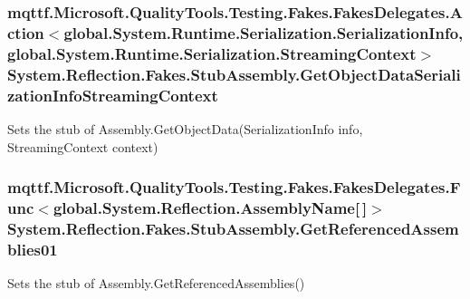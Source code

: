 \hypertarget{class_system_1_1_reflection_1_1_fakes_1_1_stub_assembly_ae5b6f1a1963fa7cfa7d3bb809ce10da7}{
\subsubsection[{Get\-Object\-Data\-Serialization\-Info\-Streaming\-Context}]{\setlength{\rightskip}{0pt plus 5cm}mqttf.\-Microsoft.\-Quality\-Tools.\-Testing.\-Fakes.\-Fakes\-Delegates.\-Action$<$global.\-System.\-Runtime.\-Serialization.\-Serialization\-Info, global.\-System.\-Runtime.\-Serialization.\-Streaming\-Context$>$ System.\-Reflection.\-Fakes.\-Stub\-Assembly.\-Get\-Object\-Data\-Serialization\-Info\-Streaming\-Context}}\label{class_system_1_1_reflection_1_1_fakes_1_1_stub_assembly_ae5b6f1a1963fa7cfa7d3bb809ce10da7}


Sets the stub of Assembly.\-Get\-Object\-Data(\-Serialization\-Info info, Streaming\-Context context)

\hypertarget{class_system_1_1_reflection_1_1_fakes_1_1_stub_assembly_a6da2bc6677f3887addc1c6f676ef32b7}{
\subsubsection[{Get\-Referenced\-Assemblies01}]{\setlength{\rightskip}{0pt plus 5cm}mqttf.\-Microsoft.\-Quality\-Tools.\-Testing.\-Fakes.\-Fakes\-Delegates.\-Func$<$global.\-System.\-Reflection.\-Assembly\-Name\mbox{[}$\,$\mbox{]}$>$ System.\-Reflection.\-Fakes.\-Stub\-Assembly.\-Get\-Referenced\-Assemblies01}}\label{class_system_1_1_reflection_1_1_fakes_1_1_stub_assembly_a6da2bc6677f3887addc1c6f676ef32b7}


Sets the stub of Assembly.\-Get\-Referenced\-Assemblies()

